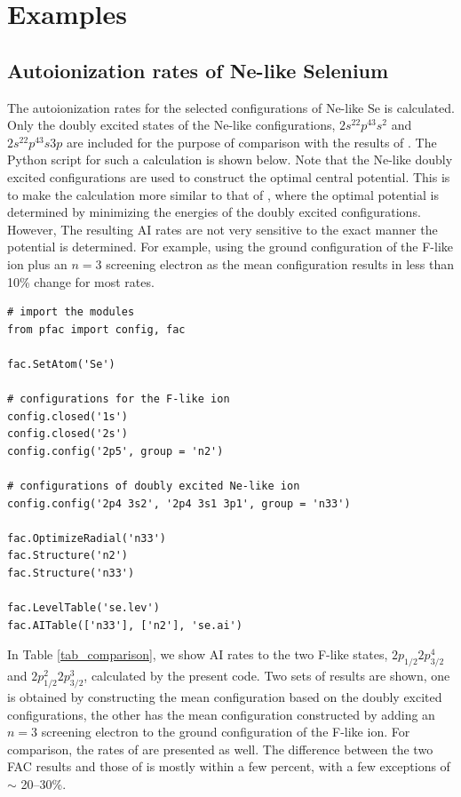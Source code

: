\documentclass{elsart}
\begin{document}
\section{Examples}
\label{sec_example}
\subsection{Autoionization rates of Ne-like Selenium}
The autoionization rates for the selected configurations of Ne-like Se is
calculated. Only the doubly excited states of the Ne-like configurations, 
$2s^22p^43s^2$ and $2s^22p^43s3p$ are included for the purpose of comparison
with the results of \citet{oreg91}. The Python script for such a calculation is
shown below. Note that the Ne-like doubly excited configurations are used to
construct the optimal central potential. This is to make the calculation
more similar to that of \citet{oreg91}, where the optimal potential is
determined by minimizing the energies of the doubly excited configurations.
However, The
resulting AI rates are not very sensitive to the exact manner the potential
is determined. For example, using the ground configuration of the F-like ion
plus an $n = 3$ screening electron as the mean configuration results in
less than 10\% change for most rates. 

\begin{verbatim}
# import the modules
from pfac import config, fac

fac.SetAtom('Se')

# configurations for the F-like ion
config.closed('1s')
config.closed('2s')
config.config('2p5', group = 'n2')

# configurations of doubly excited Ne-like ion
config.config('2p4 3s2', '2p4 3s1 3p1', group = 'n33')

fac.OptimizeRadial('n33')
fac.Structure('n2')
fac.Structure('n33')

fac.LevelTable('se.lev')
fac.AITable(['n33'], ['n2'], 'se.ai')
\end{verbatim}

In Table \ref{tab_comparison}, we show AI rates to the two F-like
states, $2p_{1/2}2p^4_{3/2}$ and $2p^2_{1/2}2p^3_{3/2}$, calculated by the
present code. Two sets of results are shown, one is obtained by constructing
the mean configuration based on the doubly excited configurations, the other
has the mean configuration constructed by adding an $n = 3$ screening electron
to the ground configuration of the F-like ion. For comparison, the rates of
\citet{oreg91} are presented as 
well. The difference between the two FAC results and those of \citet{oreg91}
is mostly within a few percent, with a few exceptions of $\sim$ 20--30\%. 
 
\end{document}
